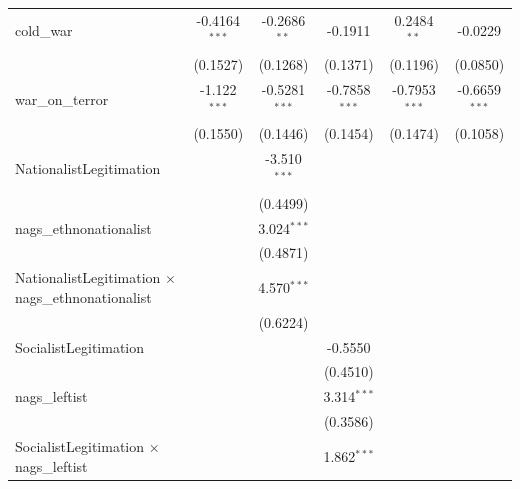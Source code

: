 \begin{tabular}{lccccc}
   cold\_war                                                 & -0.4164$^{***}$ & -0.2686$^{**}$  & -0.1911         & 0.2484$^{**}$   & -0.0229\\   
                                                             & (0.1527)        & (0.1268)        & (0.1371)        & (0.1196)        & (0.0850)\\   
   war\_on\_terror                                           & -1.122$^{***}$  & -0.5281$^{***}$ & -0.7858$^{***}$ & -0.7953$^{***}$ & -0.6659$^{***}$\\   
                                                             & (0.1550)        & (0.1446)        & (0.1454)        & (0.1474)        & (0.1058)\\   
   NationalistLegitimation                                   &                 & -3.510$^{***}$  &                 &                 &   \\   
                                                             &                 & (0.4499)        &                 &                 &   \\   
   nags\_ethnonationalist                                    &                 & 3.024$^{***}$   &                 &                 &   \\   
                                                             &                 & (0.4871)        &                 &                 &   \\   
   NationalistLegitimation $\times$ nags\_ethnonationalist   &                 & 4.570$^{***}$   &                 &                 &   \\   
                                                             &                 & (0.6224)        &                 &                 &   \\   
   SocialistLegitimation                                     &                 &                 & -0.5550         &                 &   \\   
                                                             &                 &                 & (0.4510)        &                 &   \\   
   nags\_leftist                                             &                 &                 & 3.314$^{***}$   &                 &   \\   
                                                             &                 &                 & (0.3586)        &                 &   \\   
   SocialistLegitimation $\times$ nags\_leftist              &                 &                 & 1.862$^{***}$   &                 &   \\   

\end{tabular}

